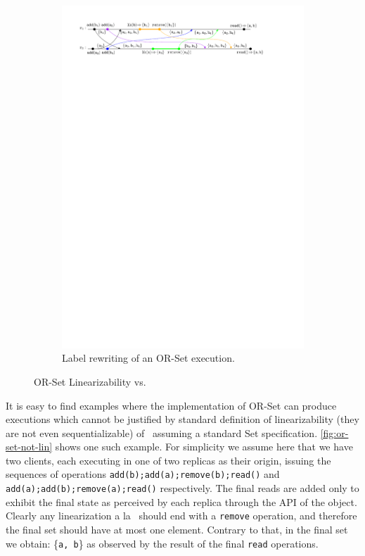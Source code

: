 \begin{figure}[t]
  \begin{subfigure}{1.0\linewidth}
    \centering
    \includegraphics[width=0.95 \textwidth]{./figures/OR-Set-lk-rem}
    \caption{Label rewriting of an OR-Set execution.}
    \label{fig:or-set-lk-rem}
  \end{subfigure}
  \caption{OR-Set Linearizability vs. \CRDTLinshort{}}
\end{figure}

It is easy to find examples where the implementation of OR-Set can
produce executions which cannot be justified by standard definition of
linearizability (they are not even sequentializable)
of~\citet{HerlihyW90} assuming a standard Set specification.
%
\autoref{fig:or-set-not-lin} shows one such example.
%
For simplicity we assume here that we have two clients, each executing
in one of two replicas as their origin, issuing the sequences of
operations \lstinline|add(b);add(a);remove(b);read()| and
\lstinline|add(a);add(b);remove(a);read()| respectively.
%
The final reads are added only to exhibit the final state as perceived by
each replica through the API of the object.
%
Clearly any linearization a la~\citet{HerlihyW90} should end with a
\lstinline|remove| operation, and therefore the final set should have
at most one element. Contrary to that, in the final set we obtain:
\{\lstinline|a, b|\} as observed by the result of the final
\lstinline|read| operations.
%

